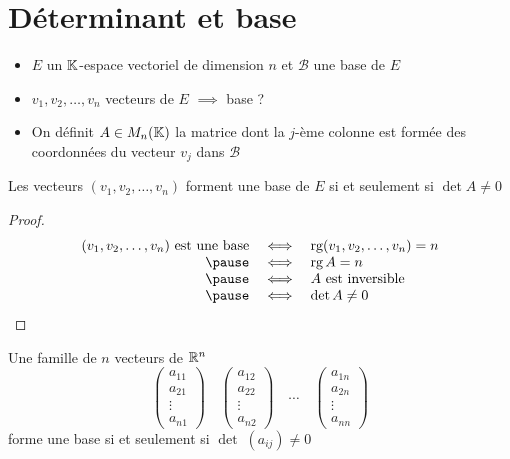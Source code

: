 \section{Déterminant et base}

\begin{frame}

\begin{itemize}
  \item $E$ un $\mathbb{K}$-espace vectoriel de dimension $n$ et $\mathcal{B}$ une base de $E$
  \item\pause $v_1,v_2,\ldots,v_n$ vecteurs de $E$ \pause $\implies$ base ?
  \item\pause On définit $A \in M_n(\mathbb{K})$ la matrice dont la $j$-ème colonne est formée des coordonnées du vecteur $v_j$ dans $\mathcal{B}$ 
\end{itemize}

\pause
\begin{theoreme}
Les vecteurs $(v_1,v_2,\ldots,v_n)$ forment une base de $E$ si et seulement si $\det A \neq 0$
\end{theoreme}

\end{frame}

\begin{frame}
\begin{proof} \pause
\[
\begin{array}{rcl}
(v_1,v_2,\ldots,v_n) \text{ est une base} 
&\iff& \rg(v_1,v_2,\ldots,v_n) = n \\
\pause&\iff& \rg A = n \\
\pause&\iff& A \text{ est inversible} \\
\pause&\iff& \det A \neq 0 
\end{array}
\]
\end{proof} 

\pause
\begin{corollaire}
Une famille de $n$ vecteurs de $\mathbb{R}^n$ 
$$\begin{pmatrix}a_{11}\\a_{21}\\\vdots\\a_{n1}\end{pmatrix}
\quad
\begin{pmatrix}a_{12}\\a_{22}\\\vdots\\a_{n2}\end{pmatrix}
\quad \cdots
\quad
\begin{pmatrix}a_{1n}\\a_{2n}\\\vdots\\a_{nn}\end{pmatrix}$$
\pause 
forme une base si et seulement si $\det \;(a_{ij}) \neq 0$
\end{corollaire}

\end{frame}


